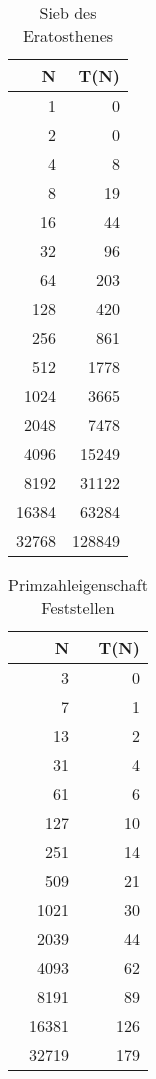 \documentclass[paper=a4, fontsize=11pt]{scrartcl} %
\numberwithin{equation}{section} %
\numberwithin{figure}{section} %
\numberwithin{table}{section} %
\begin{document}
\begin{table}[h!]
  \centering
  \begin{tabular}{ r | r }
    N & T(N) \\
    \hline
    1 & 0 \\
    2 & 0 \\
    4 & 8 \\
    8 & 19 \\
    16 & 44 \\
    32 & 96 \\
    64 & 203 \\
    128 & 420 \\
    256 & 861 \\
    512 & 1778 \\
    1024 & 3665 \\
    2048 & 7478 \\
    4096 & 15249 \\
    8192 & 31122 \\
    16384 & 63284 \\
    32768 & 128849 \\
  \end{tabular}
  \caption{Sieb des Eratosthenes}
  \label{table:3}
\end{table}

\begin{table}[h!]
  \centering
  \begin{tabular}{ r | r }
    N & T(N) \\
    \hline
    3 & 0 \\
    7 & 1 \\
    13 & 2 \\
    31 & 4 \\
    61 & 6 \\
    127 & 10 \\
    251 & 14 \\
    509 & 21 \\
    1021 & 30 \\
    2039 & 44 \\
    4093 & 62 \\
    8191 & 89 \\
    16381 & 126 \\
    32719 & 179 \\
  \end{tabular}
  \caption{Primzahleigenschaft Feststellen}
  \label{table:4}
\end{table}
\end{document}

